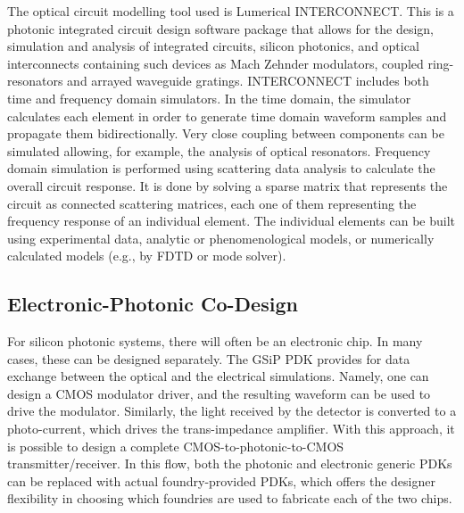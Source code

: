 \documentclass[journal]{spie}
\begin{document}
The optical circuit modelling tool used is Lumerical INTERCONNECT.  This is a photonic integrated circuit design software package that allows for the design, simulation and analysis of integrated circuits, silicon photonics, and optical interconnects containing such devices as Mach Zehnder modulators, coupled ring-resonators and arrayed waveguide gratings. INTERCONNECT includes both time and frequency domain simulators. In the time domain, the simulator calculates each element in order to generate time domain waveform samples and propagate them bidirectionally. Very close coupling between components can be simulated allowing, for example, the analysis of optical resonators. Frequency domain simulation is performed using scattering data analysis to calculate the overall circuit response. It is done by solving a sparse matrix that represents the circuit as connected scattering matrices, each one of them representing the frequency response of an individual element.  The individual elements can be built using experimental data, analytic or phenomenological models, or numerically calculated models (e.g., by FDTD or mode solver).


\subsection{Electronic-Photonic Co-Design}



For silicon photonic systems, there will often be an electronic chip.  In many cases, these can be designed separately.  
The GSiP PDK provides for data exchange between the optical and the electrical simulations.  Namely, one can design a CMOS modulator driver, and the resulting waveform can be used to drive the modulator.  Similarly, the light received by the detector is converted to a photo-current, which drives the trans-impedance amplifier.  With this approach, it is possible to design a complete CMOS-to-photonic-to-CMOS transmitter/receiver.  In this flow, both the photonic and electronic generic PDKs can be replaced with actual foundry-provided PDKs, which offers the designer flexibility in choosing which foundries are used to fabricate each of the two chips.  
\end{document}
